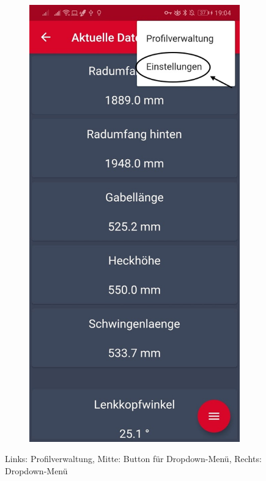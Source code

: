 \begin{figure}[H]
\begin{subfigure}[b]{0.3\textwidth}
	\end{subfigure}
	\hfill
	\begin{subfigure}[b]{0.3\textwidth}
		\includegraphics[width=1\textwidth]{../include/images/settings/Open_Settings_03}
	\end{subfigure}
	\caption{Links: Profilverwaltung, Mitte: Button für Dropdown-Menü, Rechts: Dropdown-Menü}
	\label{img:openSettings}
\end{figure}

